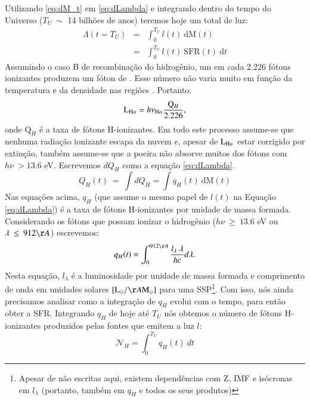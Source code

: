Utilizando \eqref{eq:dM_t} em \eqref{eq:dLambda} e integrando dentro do tempo do Universo ($T_U\ \sim$ 14 bilhões de anos) teremos hoje um total de luz:
\begin{eqnarray}
	\Lambda(t = T_U) &=& \int_0^{T_U} l(t)\ \textrm{d}\textrm{M}(t) \\
	&=& \int_0^{T_U} l(t)\ \mathrm{SFR}(t)\  \textrm{d}t
	\label{eq:Lambda}
\end{eqnarray}
\noindent Assumindo o caso B de recombinação do hidrogênio, um em cada 2.226 fótons ionizantes produzem um fóton de \Ha \citep{Osterbrock.Ferland.2006a}.
{
}
 Esse número não varia muito em função da temperatura e da densidade nas regiões \Hii. Portanto:
\begin{equation}
	\LHalpha = h \nu_{\Ha} \frac{\mathrm{Q}_H}{2.226},
	\label{eq:LHa_recomb_theory}
\end{equation}
\noindent onde $\mathrm{Q}_H$ é a taxa de fótons H-ionizantes. Em todo este processo assume-se que nenhuma radiação ionizante escapa da nuvem e, apesar de $\LHalpha$ estar corrigido por extinção, também assume-se que a poeira não absorve muitos dos fótons com $h\nu\ > 13.6$ eV. Escrevemos $dQ_H$ como a equação \eqref{eq:dLambda}.
\begin{equation}
	Q_H(t)\ =\ \int dQ_H = \int q_H(t)\ \mathrm{d}\mathrm{M}(t)
	\label{eq:QH_t}
\end{equation}
\noindent Nas equações acima, $q_H$ (que assume o mesmo papel de $l(t)$ na Equação \ref{eq:dLambda}) é a taxa de fótons H-ionizantes por unidade de massa formada. Considerando os fótons que possam ionizar o hidrogênio ($h\nu\ \geq\ 13.6$ eV ou $\lambda\ \leq\ 912\AA$) escrevemos:
\begin{equation}
	q_H(t) = \int_0^{912\AA} \frac{l_\lambda\ \lambda}{h c} d\lambda.
	\label{eq:qH}
\end{equation}
\noindent Nesta equação, $l_\lambda$ é a luminosidade por unidade de massa formada e comprimento de onda em unidades solares $[\textrm{L}_\odot/\AA\textrm{M}_\odot]$ para uma SSP\footnote{Apesar de não escritas aqui, existem dependências com Z, IMF e isócronas em $l_\lambda$ (portanto, também em $q_H$ e todos os seus produtos)}. Com isso, nós ainda precisamos analisar como a integração de $q_H$ evolui com o tempo, para então obter a SFR. Integrando $q_H$ de hoje até $T_U$ nós obtemos o número de fótons H-ionizantes produzidos pelas fontes que emitem a luz $l$:
\begin{equation}
	\mathcal{N}_H = \int_0^{T_U} q_H(t)\ dt
	\label{eq:Nh}
\end{equation}

